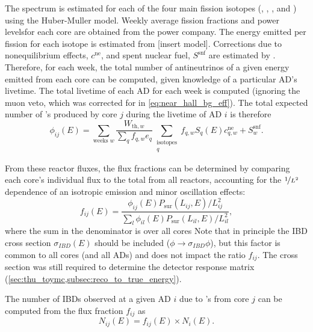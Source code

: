 The \nuebar{} spectrum is estimated for each of the four main fission isotopes
(, , , and )
using the Huber-Muller model.
Weekly average fission fractions and power levelsfor each core
are obtained from the power company.
The energy emitted per fission for each isotope is estimated from
[insert model].
Corrections due to nonequilibrium effects, $c^{\text{ne}}$,
and spent nuclear fuel, $S^{\text{snf}}$
are estimated by .
Therefore, for each week, the total number of antineutrinos
of a given energy emitted from each core can be computed,
given knowledge of a particular AD's livetime.
The total livetime of each AD for each week is computed
(ignoring the muon veto, which was corrected for in
\cref{eq:near_hall_bg_eff}).
The total expected number of \nuebar{}'s produced by core $j$
during the livetime of AD $i$ is therefore
\begin{equation}
    \phi_{ij}(E) = \sum_{\text{weeks }w}
        \frac{W_{\text{th},w}}{\sum_q f_{q,w} e_q}
        \sum_{\substack{\text{isotopes}\\q}}
        f_{q,w} S_q(E) c_{q,w}^{\text{ne}} + S_w^{\text{snf}}.
\end{equation}

From these reactor fluxes, the flux fractions can be determined
by comparing each core's individual flux to the total from all reactors,
accounting for the $\nicefrac{1}{L^2}$ dependence of an isotropic emission
and minor oscillation effects:
\begin{equation}\label{eq:flux_fraction}
    f_{ij}(E) = \frac{\phi_{ij}(E)P_\text{sur}(L_{ij}, E)/L_{ij}^2}{
        \sum_l \phi_{il}(E)P_\text{sur}(L_{il}, E)/L_{il}^2
    },
\end{equation}
where the sum in the denominator is over all cores
Note that in principle the IBD cross section $\sigma_{IBD}(E)$
should be included ($\phi \to \sigma_{IBD}\phi$),
but this factor is common to all cores (and all ADs)
and does not impact the ratio $f_{ij}$.
The cross section was still required to determine the detector response matrix
(\cref{sec:thu_toymc,subsec:reco_to_true_energy}).

The number of IBDs observed at a given AD $i$ due to \nuebar{}'s from core $j$
can be computed from the flux fraction $f_{ij}$ as
\begin{equation}\label{eq:num_ibds_from_core_ij}
    N_{ij}(E) = f_{ij}(E) \times N_i(E).
\end{equation}

